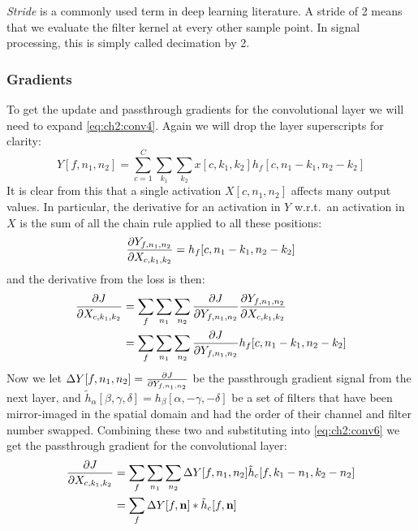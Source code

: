 \emph{Stride} is a commonly used term in deep learning literature. A stride of 2 means
that we evaluate the filter kernel at every other sample point. In signal
processing, this is simply called decimation by 2.

\subsubsection{Gradients}\label{sec:ch2:conv_grad}
To get the update and passthrough gradients for the convolutional layer we will need to expand
\eqref{eq:ch2:conv4}. Again we will drop the layer superscripts for clarity: 
\begin{equation}
  Y[f, n_1, n_2] = \sum_{c=1}^C \sum_{k_1} \sum_{k_2} x[c, k_1, k_2]
  h_f[c, n_1-k_1, n_2-k_2] \label{eq:ch2:conv5}
\end{equation}
It is clear from this that a single activation $X[c, n_1, n_2]$ affects
many output values. In particular, the derivative for an activation in $Y$
w.r.t.\ an activation in $X$ is the sum of all the chain rule applied to all
these positions:
\begin{equation}
  \frac{\partial Y_{f, n_1, n_2}}{\partial X_{c, k_1, k_2}} = h_f[c, n_1 - k_1, n_2 - k_2]
\end{equation}
and the derivative from the loss is then:
\begin{align}
  \frac{\partial J}{\partial X_{c,k_1,k_2}} &= \sum_f \sum_{n_1} \sum_{n_2} \frac{\partial J}{\partial Y_{f, n_1, n_2}}
  \frac{\partial Y_{f, n_1, n_2}}{\partial X_{c,k_1,k_2}} \\
  &= \sum_f \sum_{n_1} \sum_{n_2} \frac{\partial J}{\partial Y_{f, n_1, n_2}} h_f[c, n_1 - k_1, n_2 - k_2] \label{eq:ch2:conv6}
\end{align}
Now we let $\Delta Y[f, n_1, n_2] = \frac{\partial J}{\partial Y_{f, n_1, n_2}}$ be the passthrough gradient
signal from the next layer, and $\tilde{h}_\alpha[\beta, \gamma, \delta] = h_\beta[\alpha, -\gamma, -\delta]$
be a set of filters that have been mirror-imaged in the spatial domain and had
the order of their channel and filter number swapped. Combining these two and
substituting into \eqref{eq:ch2:conv6} we get the passthrough gradient for the
convolutional layer:
\begin{align}
  \frac{\partial J}{\partial X_{c,k_1,k_2}} &= \sum_f \sum_{n_1} \sum_{n_2} \Delta Y[f, n_1, n_2] \tilde{h}_c[f, k_1-n_1, k_2-n_2 ] \\
                          &= \sum_f \Delta Y[f, \mathbf{n}] \ast \tilde{h}_c[f, \mathbf{n}]
\end{align}
